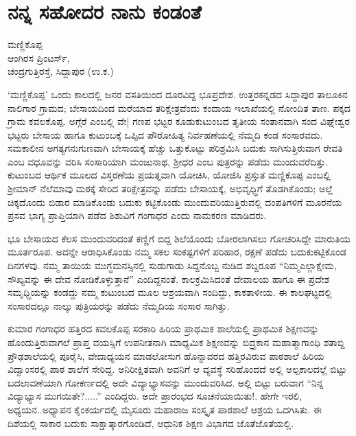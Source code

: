 {\fontsize{14}{16}\selectfont
\chapter{ನನ್ನ  ಸಹೋದರ \eng{-} ನಾನು ಕಂಡಂತೆ}

\begin{center}
\smallskip

ಮಣ್ಣಿಕೊಪ್ಪ\\
ಆಂಗಿರಸ ಪ್ರಿಂಟರ್ಸ್,\\
ಚಂದ್ರಗುತ್ತಿರಸ್ತೆ, ಸಿದ್ದಾಪುರ  (ಉ.ಕ.)
\addrule
\end{center}
‘ಮಣ್ಣಿಕೊಪ್ಪ’  ಒಂದು ಕಾಲದಲ್ಲಿ ಜನರ ವಸತಿಯಿಂದ ದೂರವಿದ್ದ ಭೂಪ್ರದೇಶ. ಉತ್ತರ\-ಕನ್ನಡದ ಸಿದ್ದಾಪುರ ತಾಲೂಕಿನ  ನಾಲಿಗಾರ ಗ್ರಾಮದ; ಬೇಸಾಯದಿಂದ ಮರೆಯಾದ ತರಿಕ್ಷೇತ್ರವೆಂದು ಕಂದಾಯ ಇಲಾಖೆಯಲ್ಲಿ ನೋಂದಿತ ತಾಣ.  ಪಕ್ಕದ ಗ್ರಾಮ ಕವಲ\-ಕೊಪ್ಪ. ಅಗ್ಗೆರೆ ಎಂಬಲ್ಲಿ ವೇ| ಗಣಪ ಭಟ್ಟರ ಕೂಡುಕುಟುಂಬದ ತೃತೀಯ ಸಂತಾನವಾಗಿ ಸಂದ ವಿಘ್ನೇಶ್ವರ ಭಟ್ಟರು ಬೇಸಾಯ ಹಾಗೂ ಕುಟುಂಬಕ್ಕೆ ಒಪ್ಪಿದ ಪೌರೋಹಿತ್ಯ ನಿರ್ವಹಣೆಯಲ್ಲಿ ನೆಮ್ಮದಿ ಕಂಡ ಸಂಸಾರವದು.  ಸಮಕಾಲೀನ ಅಗತ್ಯಗನುಗುಣವಾಗಿ ಬೇಸಾಯಕ್ಕೆ ಹೆಚ್ಚು ಒತ್ತುಕೊಟ್ಟು ಪರಿಶ್ರಮಿಸಿ ಬದುಕು ಸಾಗಿಸುತ್ತಿರುವಾಗ ರೇವತಿ ಎಂಬ ವಧೂವನ್ನು ವರಿಸಿ ಸಂಸಾರಿಯಾಗಿ ಮಂಜುನಾಥ, ಶ್ರೀಧರ ಎಂಬ ಪುತ್ರರನ್ನು  ಪಡೆದು  ಮುಂದುವರೆದಿತ್ತು.  ಕುಟುಂಬದ ಆರ್ಥಿಕ ಮೂಲದ ವಿಸ್ತರಣೆಯ  ಪ್ರಯತ್ನವಾಗಿ  ಯೋಚಿಸಿ, ಯೋಜಿಸಿ  ಪ್ರಸ್ತುತ ಮಣ್ಣಿಕೊಪ್ಪ ಎಂಬಲ್ಲಿ ಶ್ರೀಮಾನ್ ನೆಲೆಮಾವು  ಮಠಕ್ಕೆ ಸೇರಿದ ತರಿಕ್ಷೇತ್ರವನ್ನು  ಪಡೆದು ಬೇಸಾಯಕ್ಕೆ,  ಅಭಿವೃಧ್ಧಿಗೆ ತೊಡಗಿಕೊಂಡು;  ಅಲ್ಲೆ ಚಿಕ್ಕದೊಂದು ಬಿಡಾರ ಮಾಡಿಕೊಂಡು ಬದುಕು ಕಟ್ಟಿಕೊಂಡು ಮುಂದುವರಿಯುತ್ತಿರುವಲ್ಲಿ  ದಂಪತಿಗಳಿಗೆ ಮೂರನೆಯ ಪ್ರಸವ ಭಾಗ್ಯ ಪ್ರಾಪ್ತಿಯಾಗಿ ಪಡೆದ ಶಿಶುವಿಗೆ  ಗಂಗಾಧರ ಎಂದು ನಾಮಕರಣ ಮಾಡಿದರು.

ಭೂ ಬೇಸಾಯದ ಕೆಲಸ ಮುಂದುವರಿದಂತೆ ಕಣ್ಣಿಗೆ ಬಿದ್ದ  ಶಿಲೆಯೊಂದು ಬೋರಲಾಗಿಸಲು ಗೋಚರಿಸಿದ್ದೇ  ಮಾರುತಿಯ  ಮೂರ್ತರೂಪ.  ಅದನ್ನೇ ಆರಾಧಿಸಿಕೊಂಡು  ನಮ್ಮ ಸಕಲ ಸಂಕಷ್ಟಗಳಿಗೆ ಪರಿಹಾರ, ರಕ್ಷಣೆ ಪಡೆದು ಬದುಕುಕಟ್ಟಿಕೊಂಡ ದಿನಗಳವು. ನಮ್ಮ ತಾಯಿಯ ಮುಗ್ಧಮನಸ್ಸಿನಲ್ಲಿ ಸುಡುಗಾಡು ಸಿದ್ದನೊಬ್ಬ ನುಡಿದ ಶಬ್ದರೂಪ “ನಿಮ್ಮ\-ಎಲ್ಲಾಕ್ಷೇಮ, ಸೌಖ್ಯವನ್ನು ಈ ದೇವ ನೋಡಿಕೊಳ್ಳುತ್ತಾನೆ” ಎಂದಿದ್ದನಂತೆ.  ಕಾಲಕ್ರಮಿಸಿದಂತೆ   ದೇವಾಲಯ ಹಾಗೂ  ಈ ಪ್ರದೇಶ  ಸಮೃಧ್ಧಿಯನ್ನು ಕಂಡದ್ದು ನಮ್ಮ ಕುಟುಂಬದ ಮೂಲ ಆಶ್ರಯವಾಗಿ ಸಂದಿದ್ದು, ಕಾಕತಾಳೀಯ. ಈ ಕಾಲಘಟ್ಟದಲ್ಲಿ  ಸಂಸಾರದಲ್ಲೂ ನಾಲ್ಕು ಪುತ್ರಿಯರನ್ನು  ಪಡೆದು ನೆಮ್ಮದಿಯ ಸಂಸಾರ ಸಾಗಿತ್ತು.	
	
ಕುಮಾರ ಗಂಗಾಧರ ಹತ್ತಿರದ ಕವಲಕೊಪ್ಪ ಸರಕಾರಿ ಹಿರಿಯ ಪ್ರಾಥಮಿಕ ಶಾಲೆಯಲ್ಲಿ ಪ್ರಾಥಮಿಕ ಶಿಕ್ಷಣವನ್ನು ಹೊಂದುತ್ತಿರುವಾಗಲೆ ಪ್ರಾಪ್ತ ವಯಸ್ಸಿಗೆ ಉಪನೀತ\-ನಾಗಿ  ಮಾಧ್ಯಮಿಕ ಶಿಕ್ಷಣವನ್ನು ಬಿದ್ರ್ರಕಾನ ಮಹಾತ್ಮಾಗಾಂಧಿ ಶತಾಬ್ದಿ ಪ್ರೌಢಶಾಲೆಯಲ್ಲಿ ಪೂರೈಸಿ, ವೇದಾಧ್ಯಯನ ಮಾಡಲೋಸುಗ ಹೊನ್ನಾವರದ ಹತ್ತಿರವಿರುವ ಪಾಠಶಾಲೆ ಹಿರಿಯ ವಿದ್ವಾಂಸರಲ್ಲಿ ಪಾಠ ಶಾಲೆಗೆ ಸೇರಿದ್ದ.  ಅನಿರೀಕ್ಷಿತವಾಗಿ ಅವನಿಗೆ ಆ ವ್ಯವಸ್ಥೆ ಸರಿಹೊಂದದೆ ಅಲ್ಲಿ ಅಲ್ಪಕಾಲದಲ್ಲೆ ಬಿಟ್ಟು ಬದಲಾವಣೆಯಾಗಿ ಗೋಕರ್ಣದಲ್ಲಿ ಅದೇ ವಿದ್ಯಾಭ್ಯಾಸವನ್ನು ಮುಂದುವರಿಸಿದ. ಅಲ್ಲಿ ಬಿಟ್ಟು  ಬರುವಾಗ “ನಿನ್ನ ವಿದ್ಯಾಭ್ಯಾಸ ಮುಗಯಿತೇ?.....” ಎಂದಿದ್ದರು. ಅದೇ ಪ್ರಾರಂಭದ  ಸೂಚನೆಯಾಯಿತು!.  ಹೇಗೇ ಇರಲಿ, ಅಧ್ಯಯನ..ಅಧ್ಯಾಪನ ಕೈಂಕರ್ಯದಲ್ಲಿ  ಮೈಸೂರು ಮಹಾರಾಜ ಸಂಸ್ಕೃತ ಪಾಠಶಾಲೆ ಆಶ್ರಯ ಒದಗಿಸಿತು. ಈ ದಿಶೆಯಲ್ಲಿ  ಸಾಕಾರ  ಬದುಕು ಸಾಕ್ಷಾತ್ಕಾರ\-ಗೊಂಡಿದೆ, ಆಧುನಿಕ ಶಿಕ್ಷಣ ವಿಭಾಗದ ಜೊತೆಜೊತೆಯಲ್ಲಿ.

}
